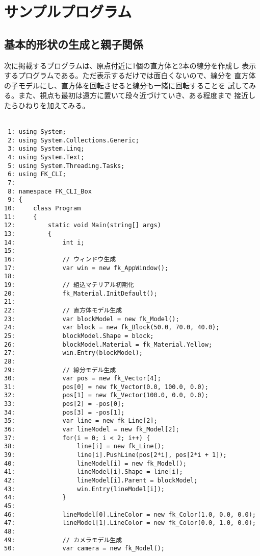 \chapter{サンプルプログラム} \label{chap:sample}
\section{基本的形状の生成と親子関係}
次に掲載するプログラムは、原点付近に1個の直方体と2本の線分を作成し
表示するプログラムである。ただ表示するだけでは面白くないので、線分を
直方体の子モデルにし、直方体を回転させると線分も一緒に回転することを
試してみる。また、視点も最初は遠方に置いて段々近づけていき、ある程度まで
接近したらひねりを加えてみる。\\ ~

\begin{breakbox}
\begin{verbatim}
 1: using System;
 2: using System.Collections.Generic;
 3: using System.Linq;
 4: using System.Text;
 5: using System.Threading.Tasks;
 6: using FK_CLI;
 7: 
 8: namespace FK_CLI_Box
 9: {
10:     class Program
11:     {
12:         static void Main(string[] args)
13:         {
14:             int i;
15: 
16:             // ウィンドウ生成
17:             var win = new fk_AppWindow();
18: 
19:             // 組込マテリアル初期化
20:             fk_Material.InitDefault();
21: 
22:             // 直方体モデル生成
23:             var blockModel = new fk_Model();
24:             var block = new fk_Block(50.0, 70.0, 40.0);
25:             blockModel.Shape = block;
26:             blockModel.Material = fk_Material.Yellow;
27:             win.Entry(blockModel);
28: 
29:             // 線分モデル生成
30:             var pos = new fk_Vector[4];
31:             pos[0] = new fk_Vector(0.0, 100.0, 0.0);
32:             pos[1] = new fk_Vector(100.0, 0.0, 0.0);
33:             pos[2] = -pos[0];
34:             pos[3] = -pos[1];
35:             var line = new fk_Line[2];
36:             var lineModel = new fk_Model[2];
37:             for(i = 0; i < 2; i++) {
38:                 line[i] = new fk_Line();
39:                 line[i].PushLine(pos[2*i], pos[2*i + 1]);
40:                 lineModel[i] = new fk_Model();
41:                 lineModel[i].Shape = line[i];
42:                 lineModel[i].Parent = blockModel;
43:                 win.Entry(lineModel[i]);
44:             }
45: 
46:             lineModel[0].LineColor = new fk_Color(1.0, 0.0, 0.0);
47:             lineModel[1].LineColor = new fk_Color(0.0, 1.0, 0.0);
48: 
49:             // カメラモデル生成
50:             var camera = new fk_Model();

\end{verbatim}
\end{breakbox}
